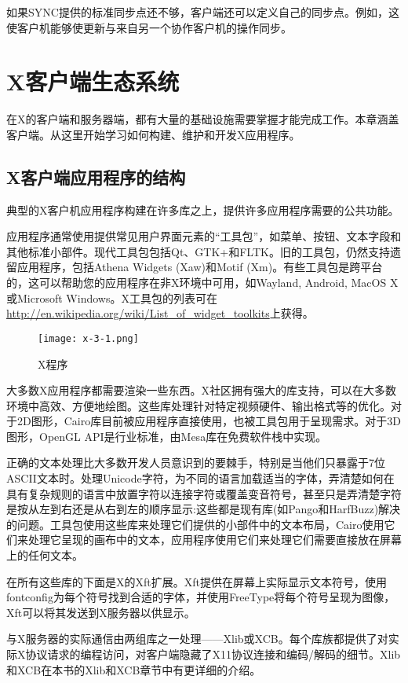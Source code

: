 如果SYNC提供的标准同步点还不够，客户端还可以定义自己的同步点。例如，这使客户机能够使更新与来自另一个协作客户机的操作同步。


\section{X客户端生态系统}

在X的客户端和服务器端，都有大量的基础设施需要掌握才能完成工作。本章涵盖客户端。从这里开始学习如何构建、维护和开发X应用程序。

\subsection{X客户端应用程序的结构}

典型的X客户机应用程序构建在许多库之上，提供许多应用程序需要的公共功能。

应用程序通常使用提供常见用户界面元素的“工具包”，如菜单、按钮、文本字段和其他标准小部件。现代工具包包括Qt、GTK+和FLTK。旧的工具包，仍然支持遗留应用程序，包括Athena Widgets (Xaw)和Motif (Xm)。有些工具包是跨平台的，这可以帮助您的应用程序在非X环境中可用，如Wayland, Android, MacOS X或Microsoft Windows。X工具包的列表可在\url{http://en.wikipedia.org/wiki/List_of_widget_toolkits}上获得。

\begin{figure}[h]
	\centering
	\texttt{[image: x-3-1.png]}
	\caption{X程序}
	\label{img-1.3.1-1}
\end{figure}

大多数X应用程序都需要渲染一些东西。X社区拥有强大的库支持，可以在大多数环境中高效、方便地绘图。这些库处理针对特定视频硬件、输出格式等的优化。对于2D图形，Cairo库目前被应用程序直接使用，也被工具包用于呈现需求。对于3D图形，OpenGL API是行业标准，由Mesa库在免费软件栈中实现。

正确的文本处理比大多数开发人员意识到的要棘手，特别是当他们只暴露于7位ASCII文本时。处理Unicode字符，为不同的语言加载适当的字体，弄清楚如何在具有复杂规则的语言中放置字符以连接字符或覆盖变音符号，甚至只是弄清楚字符是按从左到右还是从右到左的顺序显示:这些都是现有库(如Pango和HarfBuzz)解决的问题。工具包使用这些库来处理它们提供的小部件中的文本布局，Cairo使用它们来处理它呈现的画布中的文本，应用程序使用它们来处理它们需要直接放在屏幕上的任何文本。

在所有这些库的下面是X的Xft扩展。Xft提供在屏幕上实际显示文本符号，使用fontconfig为每个符号找到合适的字体，并使用FreeType将每个符号呈现为图像，Xft可以将其发送到X服务器以供显示。

与X服务器的实际通信由两组库之一处理——Xlib或XCB。每个库族都提供了对实际X协议请求的编程访问，对客户端隐藏了X11协议连接和编码/解码的细节。Xlib和XCB在本书的Xlib和XCB章节中有更详细的介绍。

